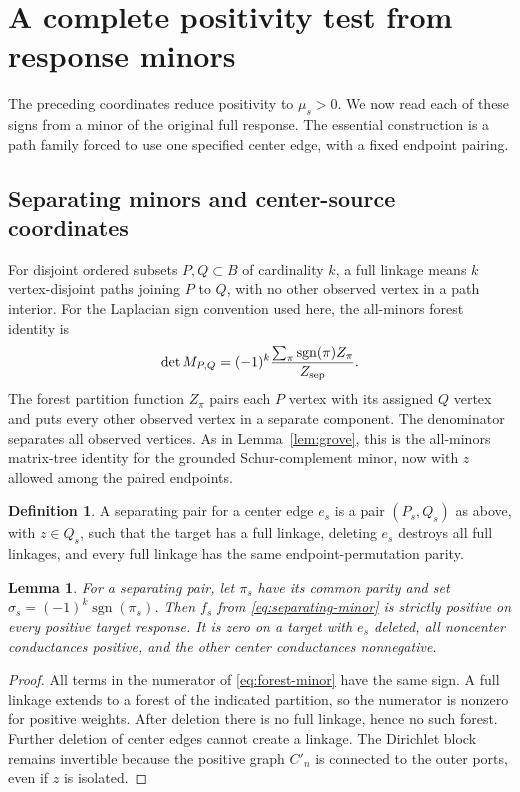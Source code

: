 \documentclass[11pt]{article}
\newtheorem{lemma}[theorem]{Lemma}
\theoremstyle{definition}
\newtheorem{definition}[theorem]{Definition}
\begin{document}
\section{A complete positivity test from response minors}
\label{sec:separation}

The preceding coordinates reduce positivity to $\mu_s>0$.
We now read each of these signs from a minor of the original full
response. The essential construction is a path family forced to use
one specified center edge, with a fixed endpoint pairing.

\subsection{Separating minors and center-source coordinates}

For disjoint ordered subsets $P,Q\subset B$ of cardinality $k$,
a full linkage means $k$ vertex-disjoint paths joining $P$ to $Q$,
with no other observed vertex in a path interior. For the Laplacian
sign convention used here, the all-minors forest identity is
\begin{equation}
 \det M_{P,Q}=(-1)^k
 \frac{\sum_\pi\operatorname{sgn}(\pi)Z_\pi}{Z_{\rm sep}}.
 \label{eq:forest-minor}
\end{equation}
The forest partition function $Z_\pi$ pairs each $P$ vertex with
its assigned $Q$ vertex and puts every other observed vertex in a
separate component. The denominator separates all observed vertices.
As in Lemma~\ref{lem:grove}, this is the all-minors matrix-tree
identity for the grounded Schur-complement minor, now with $z$
allowed among the paired endpoints.

\begin{definition}
A separating pair for a center edge $e_s$ is a pair $(P_s,Q_s)$
as above, with $z\in Q_s$, such that the target has a full linkage,
deleting $e_s$ destroys all full linkages, and every full linkage
has the same endpoint-permutation parity.
\end{definition}

\begin{lemma}
\label{lem:sign}
For a separating pair, let $\pi_s$ have its common parity and set
$\sigma_s=(-1)^k\operatorname{sgn}(\pi_s)$.
Then $f_s$ from \eqref{eq:separating-minor} is strictly positive on
every positive target response. It is zero on a target with $e_s$
deleted, all noncenter conductances positive, and the other center
conductances nonnegative.
\end{lemma}
\begin{proof}
All terms in the numerator of \eqref{eq:forest-minor} have the
same sign. A full linkage extends to a forest of the indicated
partition, so the numerator is nonzero for positive weights.
After deletion there is no full linkage, hence no such forest.
Further deletion of center edges cannot create a linkage. The
Dirichlet block remains invertible because the positive graph $C'_n$
is connected to the outer ports, even if $z$ is isolated.
\end{proof}
\end{document}
